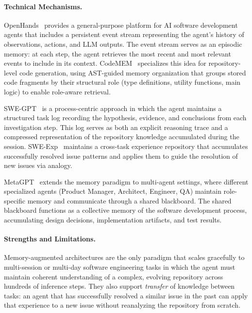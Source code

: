 \paragraph{Technical Mechanisms.}
OpenHands~\cite{wang2025openhands} provides a general-purpose platform for AI software
development agents that includes a persistent event stream representing the agent's history of
observations, actions, and LLM outputs. The event stream serves as an episodic memory: at each
step, the agent retrieves the most recent and most relevant events to include in its context.
CodeMEM~\cite{wang2026codemem} specializes this idea for repository-level code generation,
using AST-guided memory organization that groups stored code fragments by their structural
role (type definitions, utility functions, main logic) to enable role-aware retrieval.

SWE-GPT~\cite{ma2025swegpt} is a process-centric approach in which the agent maintains a
structured task log recording the hypothesis, evidence, and conclusions from each investigation
step. This log serves as both an explicit reasoning trace and a compressed representation of
the repository knowledge accumulated during the session. SWE-Exp~\cite{chen2025sweexp}
maintains a cross-task experience repository that accumulates successfully resolved issue
patterns and applies them to guide the resolution of new issues via analogy.

MetaGPT~\cite{hong2023metagpt} extends the memory paradigm to multi-agent settings, where
different specialized agents (Product Manager, Architect, Engineer, QA) maintain role-specific
memory and communicate through a shared blackboard. The shared blackboard functions as a
collective memory of the software development process, accumulating design decisions,
implementation artifacts, and test results.

\paragraph{Strengths and Limitations.}
Memory-augmented architectures are the only paradigm that scales gracefully to multi-session
or multi-day software engineering tasks in which the agent must maintain coherent understanding
of a complex, evolving repository across hundreds of inference steps. They also support
\emph{transfer} of knowledge between tasks: an agent that has successfully resolved a similar
issue in the past can apply that experience to a new issue without reanalyzing the repository
from scratch.

